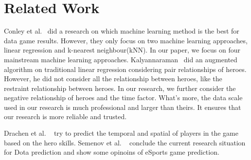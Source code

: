 \section{Related Work}
Conley et al.~\cite{conley2013does} did a research on which machine learning method is the best for data game results.
However, they only focus on two machine learning approaches, linear regression and k-nearest neighbour(kNN).
In our paper, we focus on four mainstream machine learning approaches.
Kalyannaraman~\cite{kau2013win} did an augmented algorithm on traditional linear regression considering pair relationships of heroes.
However, he did not consider all the relationship between heroes, like the restraint relationship between heroes.
In our research, we further consider the negative relationship of heroes and the time factor.
What's more, the data scale used in our research is much professional and larger than theirs.
It ensures that our research is more reliable and trusted.

Drachen et al. ~\cite{drachen2014skill} try to predict the temporal and spatial of players in the game based on the hero skills.
Semenov et al. ~\cite{semenovapplications} conclude the current research situation for Dota prediction
and show some opinoins of eSports game prediction.

